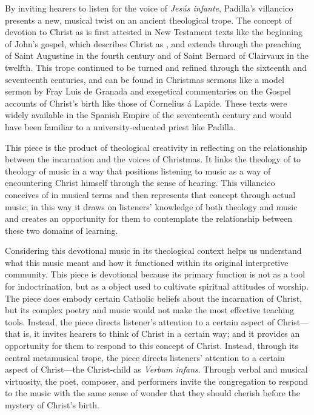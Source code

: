 By inviting hearers to listen for the voice of \emph{Jesús infante}, Padilla's
villancico presents a new, musical twist on an ancient theological trope.
The concept of devotion to Christ as  is first attested in New
Testament texts like the beginning of John's gospel, which describes Christ as
, and extends through the preaching of Saint Augustine in
the fourth century and of Saint Bernard of Clairvaux in the twelfth.
This trope continued to be turned and refined through the sixteenth and
seventeenth centuries, and can be found in Christmas sermons like a model sermon
by Fray Luis de Granada and exegetical commentaries on the Gospel accounts of
Christ's birth like those of Cornelius á Lapide.
These texts were widely available in the Spanish Empire of the seventeenth
century and would have been familiar to a university-educated priest like
Padilla.

This piece is the product of theological creativity in reflecting on the
relationship between the incarnation and the voices of Christmas. 
It links the theology of  to theology of music in a way that positions
listening to music as a way of encountering Christ himself through the sense of
hearing.
This villancico conceives of  in musical terms and then represents
that concept through actual music; in this way it draws on listeners' knowledge
of both theology and music and creates an opportunity for them to contemplate
the relationship between these two domains of learning.

Considering this devotional music in its theological context helps us understand
what this music meant and how it functioned within its original interpretive
community.
This piece is devotional because its primary function is not as a tool for
indoctrination, but as a object used to cultivate spiritual attitudes of
worship.
The piece does embody certain Catholic beliefs about the incarnation of Christ,
but its complex poetry and music would not make the most effective teaching
tools.
Instead, the piece directs listener's attention to a certain aspect of
Christ---that is, it invites hearers to think of Christ in a certain way; and it
provides an opportunity for them to respond to this concept of Christ.
Instead, through its central metamusical trope, the piece directs listeners'
attention to a certain aspect of Christ---the Christ-child as \emph{Verbum
infans}.
Through verbal and musical virtuosity, the poet, composer, and performers invite
the congregation to respond to the music with the same sense of wonder that they
should cherish before the mystery of Christ's birth.  

